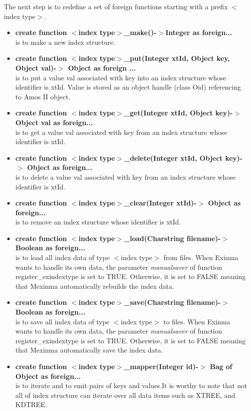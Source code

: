 \documentclass[12pt]{article}
\begin{document}
The next step is to redefine a set of foreign functions starting with a prefix $<$index type$>$.
\begin{itemize}
\item \textbf{create function $<$index type$>$\_make()-$>$Integer as foreign...}\\
    is to make a new index structure.
\item \textbf{create function $<$index type$>$\_put(Integer xtId, Object key, Object val)-$>$ Object as foreign ...}\\
    is to put a value val associated with key into an index structure whose identifier is xtId. Value is stored as an object handle (class Oid) referencing to Amos II object.

\item \textbf{\textbf{create function $<$index type$>$\_get(Integer xtId, Object key)-$>$ Object val as foreign...}}\\
    is to get a value val associated with key from an index structure whose identifier is xtId.

\item \textbf{create function $<$index type$>$\_delete(Integer xtId, Object key)-$>$ Object as foreign...}\\
    is to delete a value val associated with key from an index structure whose identifier is xtId.

\item \textbf{create function $<$index type$>$\_clear(Integer xtId)-$>$ Object as foreign...}\\
    is to remove an index structure whose identifier is xtId.

\item \textbf{create function $<$index type$>$\_load(Charstring filename)-$>$ Boolean as foreign...}\\
    is to load all index data of type $<$index type$>$ from files. When Exinma wants to handle its own data, the parameter \emph{manualsaver} of function register\_exindextype is set to TRUE. Otherwise, it is set to FALSE meaning that Mexinma automatically rebuilds the index data.

\item \textbf{create function $<$index type$>$\_save(Charstring filename)-$>$ Boolean as foreign...}\\
    is to save all index data of type $<$index type$>$ to files. When Exinma wants to handle its own data, the parameter \emph{manualsaver} of function register\_exindextype is set to TRUE. Otherwise, it is set to FALSE meaning that Mexinma automatically save the index data.

\item \textbf{create function $<$index type$>$\_mapper(Integer id)-$>$ Bag of Object as foreign...}\\
    is to iterate and to emit pairs of keys and values.It is worthy to note that not all of index structure can iterate over all data items such as XTREE, and KDTREE.
\end{itemize}
\end{document}
